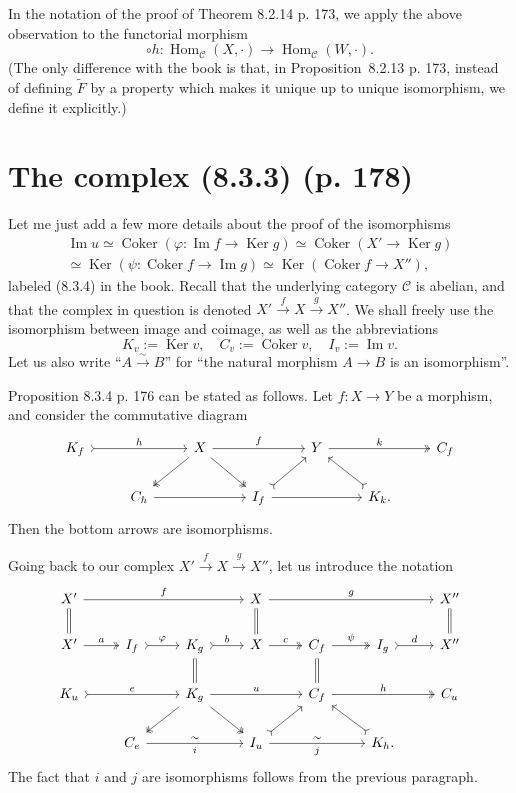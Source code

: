 \documentclass[12pt]{article}
\theoremstyle{remark}%
\newcommand{\C}{\mathcal C}
\newcommand{\p}{\varphi}
\newcommand{\pr}{Proposition}
\DeclareMathOperator{\Coker}{Coker}
\DeclareMathOperator{\Ima}{Im}
\DeclareMathOperator{\h}{Hom}
\DeclareMathOperator{\Ker}{Ker}
\begin{document}
In the notation of the proof of Theorem 8.2.14 p. 173, we apply the above observation to the functorial morphism 
$$ 
\circ h:\h_\C(X,\cdot)\to\h_\C(W,\cdot). 
$$ 
(The only difference with the book is that, in \pr\ 8.2.13 p. 173, instead of defining $\widetilde F$ by a property which makes it unique up to unique isomorphism, we define it explicitly.) 
%
\section{The complex (8.3.3) (p. 178)}%
%
Let me just add a few more details about the proof of the isomorphisms
\begin{equation}\label{834}
\begin{split}
\Ima u\simeq\Coker(\p:\Ima f\to\Ker g)\simeq\Coker(X'\to\Ker g)\\ 
\simeq\Ker(\psi:\Coker f\to\Ima g)\simeq\Ker(\Coker f\to X''),
\end{split}
\end{equation}
labeled (8.3.4) in the book. Recall that the underlying category $\C$ is abelian, and that the complex in question is denoted $X'\xrightarrow{f}X\xrightarrow{g}X''$. We shall freely use the isomorphism between image and coimage, as well as the abbreviations 
$$
K_v:=\Ker v,\quad C_v:=\Coker v,\quad I_v:=\Ima v.
$$ 
Let us also write ``$A\overset{\sim}{\to}B$'' for ``the natural morphism $A\to B$ is an isomorphism''. 

Proposition 8.3.4 p. 176 can be stated as follows. Let $f:X\to Y$ be a morphism, and consider the commutative diagram 
$$
\begin{tikzcd}
K_f\ar[tail]{rr}{h}&&X\ar{rr}{f}\ar[two heads]{dl}\ar[two heads]{dr}&&Y\ar[two heads]{rr}{k}&&C_f\\ 
&C_h\ar{rr}&&I_f\ar[tail]{ur}\ar{rr}&&K_k.\ar[tail]{ul}
\end{tikzcd}
$$ 
Then the bottom arrows are isomorphisms.  

Going back to our complex $X'\overset{f}{\to}X\overset{g}{\to}X''$, let us introduce the notation 
$$
\begin{tikzcd}
X'\ar{rrr}{f}\ar[equal]{d}&&&X\ar[equal]{d}\ar{rrr}{g}&&&X''\ar[equal]{d}\\ 
X'\ar[two heads]{r}{a}&I_f\ar[tail]{r}{\p}&K_g\ar[equal]{d}\ar[tail]{r}{b}&X\ar[two heads]{r}{c}&C_f\ar[equal]{d}\ar[two heads]{r}{\psi}&I_g\ar[tail]{r}{d}&X''\\ 
K_u\ar[tail]{rr}{e}&&K_g\ar[two heads]{dl}\ar[two heads]{dr}\ar{rr}{u}&&C_f\ar[two heads]{rr}{h}&&C_u\\ 
&C_e\ar{rr}{\sim}[swap]{i}&&I_u\ar[tail]{ur}\ar{rr}{\sim}[swap]{j}&&K_h.\ar[tail]{ul}
\end{tikzcd}
$$ 
The fact that $i$ and $j$ are isomorphisms follows from the previous paragraph. 
\end{document}
